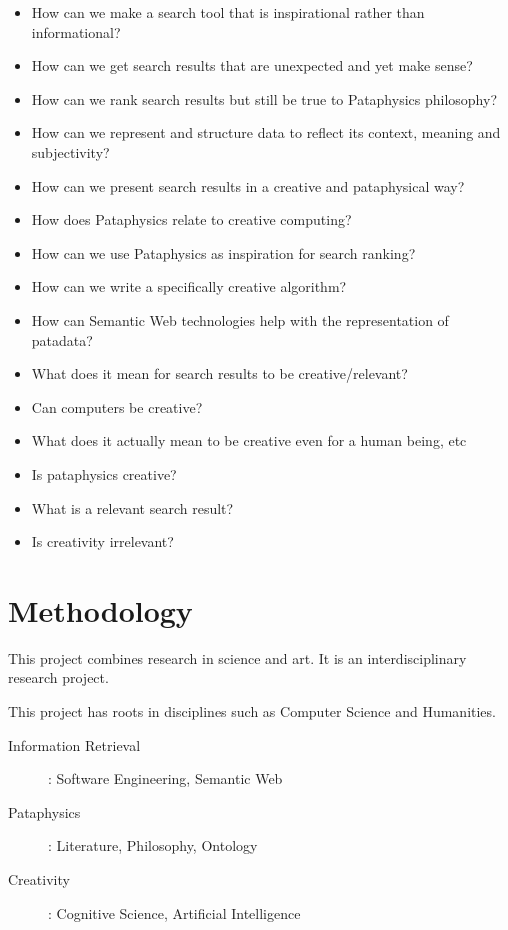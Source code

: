 \begin{itemize}
  \item How can we make a search tool that is inspirational rather than informational?
  \item How can we get search results that are unexpected and yet make sense?
  \item How can we rank search results but still be true to Pataphysics philosophy?
  \item How can we represent and structure data to reflect its context, meaning and subjectivity?
  \item How can we present search results in a creative and pataphysical way?
  \item How does Pataphysics relate to creative computing?
  \item How can we use Pataphysics as inspiration for search ranking?
  \item How can we write a specifically creative algorithm?
  \item How can Semantic Web technologies help with the representation of patadata?
  \item What does it mean for search results to be creative/relevant?
  \item Can computers be creative?
  \item What does it actually mean to be creative even for a human being, etc
  \item Is pataphysics creative?
  \item What is a relevant search result?
  \item Is creativity irrelevant?
\end{itemize}


\section{Methodology}

This project combines research in science and art. It is an interdisciplinary research project.

This project has roots in disciplines such as Computer Science and Humanities.
\begin{description}
  \item [Information Retrieval]: Software Engineering, Semantic Web
  \item [Pataphysics]: Literature, Philosophy, Ontology
  \item [Creativity]: Cognitive Science, Artificial Intelligence
\end{description}

